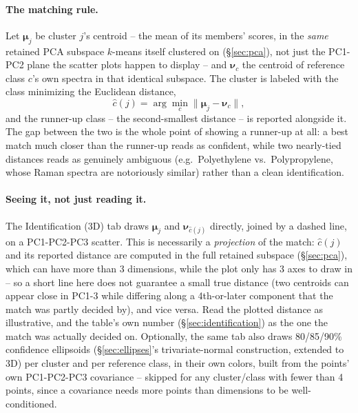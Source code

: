 \documentclass[11pt,a4paper]{article}
\begin{document}
\paragraph{The matching rule.} Let $\boldsymbol\mu_j$ be cluster $j$'s
centroid -- the mean of its members' scores, in the \emph{same} retained
PCA subspace $k$-means itself clustered on (\S\ref{sec:pca}), not just the
PC1-PC2 plane the scatter plots happen to display -- and
$\boldsymbol\nu_c$ the centroid of reference class $c$'s own spectra in
that identical subspace. The cluster is labeled with the class minimizing
the Euclidean distance,
\[
  \hat c(j) = \arg\min_c \big\lVert \boldsymbol\mu_j - \boldsymbol\nu_c \big\rVert ,
\]
and the runner-up class -- the second-smallest distance -- is reported
alongside it. The gap between the two is the whole point of showing a
runner-up at all: a best match much closer than the runner-up reads as
confident, while two nearly-tied distances reads as genuinely ambiguous
(e.g.\ Polyethylene vs.\ Polypropylene, whose Raman spectra are
notoriously similar) rather than a clean identification.

\paragraph{Seeing it, not just reading it.} The Identification (3D) tab
draws $\boldsymbol\mu_j$ and $\boldsymbol\nu_{\hat c(j)}$ directly, joined
by a dashed line, on a PC1-PC2-PC3 scatter. This is necessarily a
\emph{projection} of the match: $\hat c(j)$ and its reported distance are
computed in the full retained subspace (\S\ref{sec:pca}), which can have
more than 3 dimensions, while the plot only has 3 axes to draw in -- so a
short line here does not guarantee a small true distance (two centroids
can appear close in PC1-3 while differing along a 4th-or-later component
that the match was partly decided by), and vice versa. Read the plotted
distance as illustrative, and the table's own number
(\S\ref{sec:identification}) as the one the match was actually decided
on. Optionally, the same tab also draws 80/85/90\% confidence ellipsoids
(\S\ref{sec:ellipses}'s trivariate-normal construction, extended to 3D)
per cluster and per reference class, in their own colors, built from the
points' own PC1-PC2-PC3 covariance -- skipped for any cluster/class with
fewer than 4 points, since a covariance needs more points than dimensions
to be well-conditioned.
\end{document}
